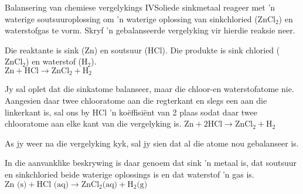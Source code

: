       \noindent
\begin{wex}{Balansering van chemiese vergelykings IV}{Soliede sinkmetaal reageer met  'n waterige soutsuuroplossing om 'n waterige oplossing van  sinkchloried ($\text{ZnCl}_{2}$) en waterstofgas te vorm. Skryf 'n gebalanseerde vergelyking vir hierdie reaksie neer.}{
Die reaktante is sink ($\text{Zn}$) en soutsuur ($\text{HCl}$). Die produkte is sink chloried ($\text{ZnCl}_{2}$) en waterstof ($\text{H}_{2}$).\\


${\text{Zn} + \text{HCl} \rightarrow \text{ZnCl}_{2} + \text{H}_{2}}$


Jy sal oplet dat die sinkatome balanseer, maar die chloor-en waterstofatome nie. Aangesien daar twee chlooratome aan die regterkant en slegs een aan die linkerkant is, sal ons by HCl 'n ko\"{e}ffisiënt van 2 plaas sodat daar twee chlooratome aan elke kant van die  vergelyking is.
${\text{Zn} + 2\text{HCl} \rightarrow \text{ZnCl}_{2} + \text{H}_{2}}$


 As jy weer na die vergelyking kyk, sal jy sien dat al die atome nou gebalanseer is.


In die aanvanklike beskrywing is daar genoem dat sink 'n metaal is, dat soutsuur en sinkchloried beide waterige oplossings is  en dat waterstof 'n gas is.
$\text{Zn (s)} + \text{HCl (aq)} \rightarrow \text{ZnCl}_{2} \text{(aq)} + \text{H}_{2} \text{(g)}$
}
\end{wex}
    \noindent
\par


